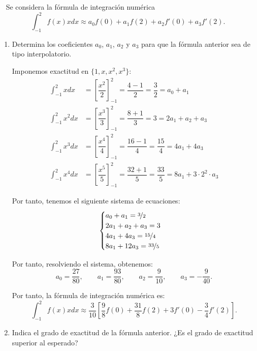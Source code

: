 \begin{ejercicio}~\label{ej:2.3.5}
    Se considera la fórmula de integración numérica
    \begin{equation*}
        \int_{-1}^{2} f(x)x dx \approx a_0 f(0) + a_1 f(2) + a_2 f'(0) + a_3f'(2).
    \end{equation*}
    \begin{enumerate}
        \item Determina los coeficientes $a_0$, $a_1$, $a_2$ y $a_3$ para que la fórmula anterior sea de tipo interpolatorio.
        
        Imponemos exactitud en $\{1, x, x^2, x^3\}$:
        \begin{align*}
            \int_{-1}^{2} x dx &= \left[\dfrac{x^2}{2}\right]_{-1}^{2} = \dfrac{4-1}{2} = \dfrac{3}{2} = a_0 + a_1\\
            \int_{-1}^{2} x^2 dx &= \left[\dfrac{x^3}{3}\right]_{-1}^{2} = \dfrac{8+1}{3} = 3 = 2a_1 + a_2 + a_3\\
            \int_{-1}^{2} x^3 dx &= \left[\dfrac{x^4}{4}\right]_{-1}^{2} = \dfrac{16-1}{4} = \dfrac{15}{4} = 4a_1 + 4a_3\\
            \int_{-1}^{2} x^4 dx &= \left[\dfrac{x^5}{5}\right]_{-1}^{2} = \dfrac{32+1}{5} = \dfrac{33}{5} = 8a_1 + 3\cdot 2^2\cdot a_3
        \end{align*}

        Por tanto, tenemos el siguiente sistema de ecuaciones:
        \begin{equation*}
            \begin{cases}
                a_0 + a_1 = \nicefrac{3}{2}\\
                2a_1 + a_2 + a_3 = 3\\
                4a_1 + 4a_3 = \nicefrac{15}{4}\\
                8a_1 + 12a_3 = \nicefrac{33}{5}
            \end{cases}
        \end{equation*}

        Por tanto, resolviendo el sistema, obtenemos:
        \begin{equation*}
            a_0 = \dfrac{27}{80},\qquad
            a_1 = \dfrac{93}{80},\qquad
            a_2 = \dfrac{9}{10},\qquad
            a_3 = -\dfrac{9}{40}.
        \end{equation*}

        Por tanto, la fórmula de integración numérica es:
        \begin{equation*}
            \int_{-1}^{2} f(x)x dx \approx \dfrac{3}{10}\left[\dfrac{9}{8}f(0) + \dfrac{31}{8}f(2) + 3f'(0) - \dfrac{3}{4}f'(2)\right].
        \end{equation*}
        \item Indica el grado de exactitud de la fórmula anterior. ¿Es el grado de exactitud superior al esperado?
        

\end{enumerate}
\end{ejercicio}
